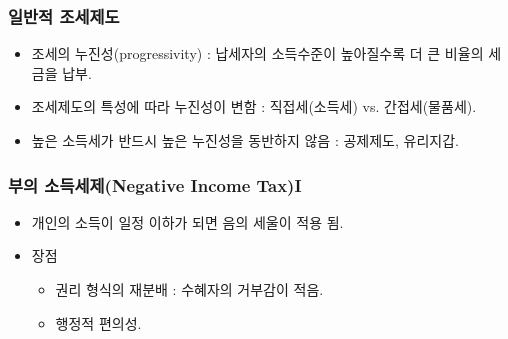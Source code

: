 \documentclass[aspectratio=169,xcolor=dvipsnames,handout]{beamer}
\begin{document}
\begin{frame}[<+->]
\frametitle{일반적 조세제도}
    \begin{itemize}
        \item 조세의 누진성(progressivity) : 납세자의 소득수준이 높아질수록 더 큰 비율의 세금을 납부.
        \item 조세제도의 특성에 따라 누진성이 변함 : 직접세(소득세) vs. 간접세(물품세).
        \item 높은 소득세가 반드시 높은 누진성을 동반하지 않음 : 공제제도, 유리지갑.
    \end{itemize}
\end{frame}

\begin{frame}[<+->]
\frametitle{부의 소득세제(Negative Income Tax)I}
    \begin{itemize}
        \item 개인의 소득이 일정 이하가 되면 음의 세울이 적용 됨. 
        \item 장점
        \begin{itemize}
            \item 권리 형식의 재분배 : 수혜자의 거부감이 적음.
            \item 행정적 편의성.
        \end{itemize} 
    \end{itemize}
\end{frame}
\end{document}
